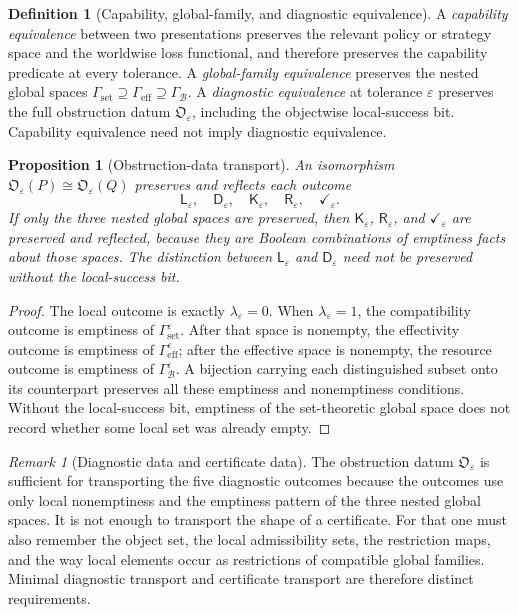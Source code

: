 \documentclass[11pt]{article}
\theoremstyle{plain}
\newtheorem{proposition}[theorem]{Proposition}
\theoremstyle{definition}
\newtheorem{definition}[theorem]{Definition}
\theoremstyle{remark}
\newtheorem{remark}[theorem]{Remark}
\newcommand{\eps}{\varepsilon}
\begin{document}
\begin{definition}[Capability, global-family, and diagnostic equivalence]
\label{def:equivalence-levels}
A \emph{capability equivalence} between two presentations preserves the relevant
policy or strategy space and the worldwise loss functional, and therefore
preserves the capability predicate at every tolerance. A \emph{global-family
equivalence} preserves the nested global spaces
$\Gamma_{\mathrm{set}}\supseteq\Gamma_{\mathrm{eff}}\supseteq
\Gamma_{\mathcal B}$. A \emph{diagnostic equivalence} at tolerance $\eps$
preserves the full obstruction datum $\mathfrak O_\eps$, including the
objectwise local-success bit. Capability equivalence need not imply diagnostic
equivalence.
\end{definition}

\begin{proposition}[Obstruction-data transport]
\label{prop:obstruction-transport}
An isomorphism $\mathfrak O_\eps(P)\cong\mathfrak O_\eps(Q)$ preserves and
reflects each outcome
\[
\mathsf L_\eps,\quad\mathsf D_\eps,\quad
\mathsf K_\eps,\quad\mathsf R_\eps,\quad\checkmark_\eps.
\]
If only the three nested global spaces are preserved, then
$\mathsf K_\eps$, $\mathsf R_\eps$, and $\checkmark_\eps$ are preserved and
reflected, because they are Boolean combinations of emptiness facts about those
spaces. The distinction between $\mathsf L_\eps$ and $\mathsf D_\eps$ need not
be preserved without the local-success bit.
\end{proposition}

\begin{proof}
The local outcome is exactly $\lambda_\eps=0$. When $\lambda_\eps=1$, the
compatibility outcome is emptiness of $\Gamma_{\mathrm{set}}^\eps$. After that
space is nonempty, the effectivity outcome is emptiness of
$\Gamma_{\mathrm{eff}}^\eps$; after the effective space is nonempty, the
resource outcome is emptiness of $\Gamma_{\mathcal B}^\eps$. A bijection
carrying each distinguished subset onto its counterpart preserves all these
emptiness and nonemptiness conditions. Without the local-success bit, emptiness
of the set-theoretic global space does not record whether some local set was
already empty.
\end{proof}

\begin{remark}[Diagnostic data and certificate data]
The obstruction datum $\mathfrak O_\eps$ is sufficient for transporting the five
diagnostic outcomes because the outcomes use only local nonemptiness and the
emptiness pattern of the three nested global spaces. It is not enough to
transport the shape of a certificate. For that one must also remember the object
set, the local admissibility sets, the restriction maps, and the way local
elements occur as restrictions of compatible global families. Minimal diagnostic
transport and certificate transport are therefore distinct requirements.
\end{remark}
\end{document}
